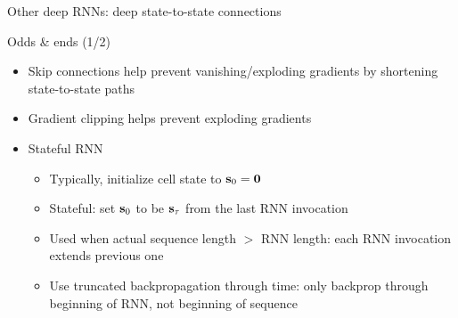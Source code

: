 \begin{frame}{Other deep RNN{}s: deep state-to-state connections \citep{PascanuICLR14}}
    
    
\end{frame}

\begin{frame}{Odds \& ends (1/2)}
    \begin{itemize}
        \item<+-> Skip connections help prevent vanishing/exploding gradients by shortening state-to-state paths
        \item<+-> Gradient clipping helps prevent exploding gradients \citep{MikolovPhD12,PascanuICML13}
        \item<+-> Stateful RNN{}
        \begin{itemize}[<.->]
            \item Typically, initialize cell state to $\mathbf{s}_0 = \mathbf{0}$
            \item<+-> Stateful: set $\mathbf{s}_0$ to be $\mathbf{s}_\tau$ from the last RNN{} invocation
            \item Used when actual sequence length $>$ RNN length: each RNN invocation extends previous one
            \item Use truncated backpropagation through time: only backprop through beginning of RNN, not beginning of sequence
        \end{itemize}
    \end{itemize}

    \centering
    
\end{frame}

